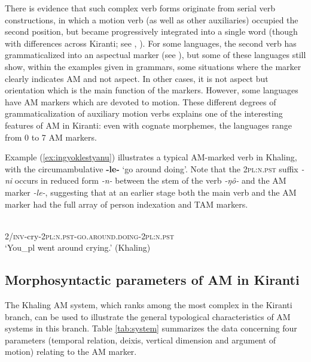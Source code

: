 \documentclass[oneside,a4paper,11pt]{article}
\newcommand{\ipa}[1]{{\phon\textit{#1}}}
\newcommand{\rouge}[1]{{\color{red}#1}}
\begin{document}

There is evidence that such complex verb forms originate from serial verb constructions, in which a motion verb (as well as other auxiliaries) occupied the second position, but became progressively integrated into a single word (though with differences across Kiranti; see \citealt{bickel07chintang}, \citealt{schiering10prosodic}). For some languages, the second verb has grammaticalized into an aspectual marker (see \citealt{bickel96aspect}), but some of these languages still show, within the examples given in grammars, some situations where the marker clearly indicates AM and not aspect.  In other cases, it is not aspect but orientation which is the main function of the markers.  However, some languages have AM markers which are devoted to motion.  These different degrees of grammaticalization of auxiliary motion verbs explains one of the interesting features of AM in Kiranti: even with cognate morphemes, the languages range from 0 to 7 AM markers. 


Example (\ref{ex:ingyoklestyanu}) illustrates a typical AM-marked verb in Khaling, with the circumambulative \textbf{-le-} `go around doing'. Note that the \textsc{2pl:n.pst} suffix \ipa{-ni} occurs in reduced form \ipa{-n-} between the stem of the verb \ipa{-ŋô-} and  the AM marker \ipa{-le-}, suggesting that at an earlier stage both the main verb and the AM marker had the full array of person indexation and TAM markers.

\begin{exe}
\ex \label{ex:ingyoklestyanu}
\gll \ipa{ʔi-ŋô-n-\rouge{le}-ni} \\
2/\textsc{inv}-cry-\textsc{2pl:n.pst}-\textsc{\rouge{go.around.doing}}-\textsc{2pl:n.pst} \\
\glt `You_{pl} went around crying.'  (Khaling)
\end{exe}


\subsection{Morphosyntactic parameters of AM in Kiranti}
The Khaling AM system, which ranks among the most complex in the Kiranti branch, can be used to illustrate the general typological characteristics of AM systems in this branch. Table \ref{tab:system} summarizes the data concerning four parameters (temporal relation, deixis, vertical dimension and argument of motion) relating to the AM marker.
\end{document}

